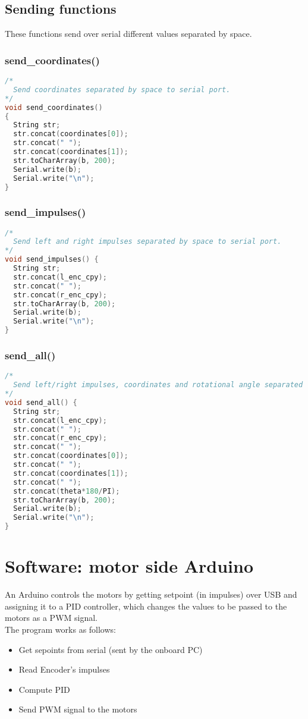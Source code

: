 \subsection{Sending functions}
These functions send over serial different values separated by space.

\subsubsection{send\_coordinates()}

\begin{lstlisting}[language=C]
/* 
  Send coordinates separated by space to serial port. 
*/
void send_coordinates()
{
  String str;
  str.concat(coordinates[0]);
  str.concat(" ");
  str.concat(coordinates[1]);
  str.toCharArray(b, 200);
  Serial.write(b);
  Serial.write("\n");
}
\end{lstlisting}


\subsubsection{send\_impulses()}

\begin{lstlisting}[language=C]
/* 
  Send left and right impulses separated by space to serial port. 
*/
void send_impulses() {
  String str;
  str.concat(l_enc_cpy);
  str.concat(" ");
  str.concat(r_enc_cpy);
  str.toCharArray(b, 200);
  Serial.write(b);
  Serial.write("\n");
}
\end{lstlisting}

\subsubsection{send\_all()}

\begin{lstlisting}[language=C]
/* 
  Send left/right impulses, coordinates and rotational angle separated by space to serial port. 
*/
void send_all() {
  String str;
  str.concat(l_enc_cpy);
  str.concat(" ");
  str.concat(r_enc_cpy);
  str.concat(" ");
  str.concat(coordinates[0]);
  str.concat(" ");
  str.concat(coordinates[1]);
  str.concat(" ");
  str.concat(theta*180/PI);
  str.toCharArray(b, 200);
  Serial.write(b);
  Serial.write("\n");
}
\end{lstlisting}

\section{Software: motor side Arduino}
An Arduino controls the motors by getting setpoint (in impulses) over USB and assigning it to a PID controller, which changes the values to be passed to the motors as a PWM signal.
\\
The program works as follows:
\begin{itemize}
    \item Get sepoints from serial (sent by the onboard PC)
    \item Read Encoder's impulses
    \item Compute PID
    \item Send PWM signal to the motors
\end{itemize}

